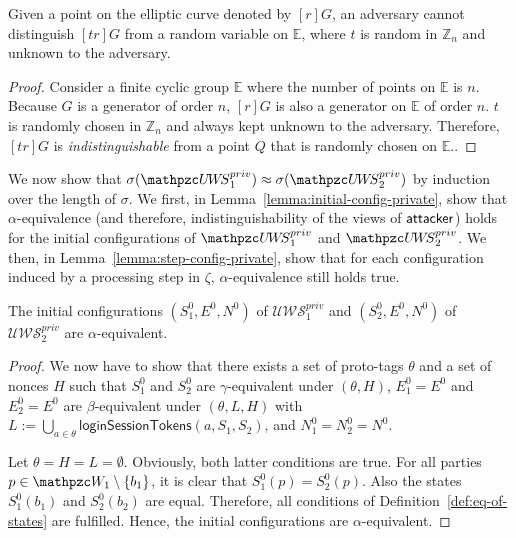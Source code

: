 \begin{theorem}
  \begin{lemma}\label{thm-idp-untraceability-new}
    Given a point on the elliptic curve denoted by $[r]G$, 
    an adversary cannot distinguish $[tr]G$ from a random variable on $\mathbb{E}$, 
    where $t$ is random in $\mathbb{Z}_n$ and unknown to the adversary.
  \end{lemma}
  \begin{proof}
    Consider a finite cyclic group $\mathbb{E}$ where the number of points on $\mathbb{E}$ is $n$. 
    Because $G$ is a generator of order $n$, $[r]G$ is also a generator on $\mathbb{E}$ of order $n$. 
    $t$ is randomly chosen in $\mathbb{Z}_n$ and always kept unknown to the adversary. 
    Therefore, $[tr]G$ is \emph{indistinguishable} from a point $Q$ that is randomly chosen on $\mathbb{E}$.\cite{oprf-proved,voprf-proved}.
  \end{proof}
  
  We now show that $\sigma(\uppressoprivwebsystem_1) \approx
  \sigma(\uppressoprivwebsystem_2)$ by induction over the length 
  of $\sigma$. We first, in Lemma~\ref{lemma:initial-config-private}, 
  show that $\alpha$-equivalence (and therefore, indistinguishability 
  of the views of $\mathsf{attacker}$) holds for the initial 
  configurations of $\uppressoprivwebsystem_1$ and 
  $\uppressoprivwebsystem_2$. We then, in 
  Lemma~\ref{lemma:step-config-private}, show that for each 
  configuration induced by a processing step in $\zeta$,
  $\alpha$-equivalence still holds true.
  
  \begin{lemma}\label{lemma:initial-config-private}
    The initial configurations $(S_1^0,E^0,N^0)$ of 
    $\mathcal{U\!W\!S}^{priv}_1$ and $(S_2^0,E^0,N^0)$ of 
    $\mathcal{U\!W\!S}^{priv}_2$ are $\alpha$-equivalent.
  \end{lemma}
  \begin{proof}
    We now have to show that there exists a set of proto-tags $\theta$ and a set of nonces $H$
    such that $S_1^0$ and $S_2^0$ are $\gamma$-equivalent under
    $(\theta,H)$, $E_1^0 = E^0$ and $E_2^0 = E^0$ are $\beta$-equivalent
    under $(\theta,L,H)$ with $L := \bigcup_{a\in\theta} \mathsf{loginSessionTokens}(a,S_1,S_2)$, and $N_1^0 = N_2^0 = N^0$.
  
    Let $\theta = H = L = \emptyset$. Obviously, both latter conditions are
    true. For all parties $p \in \bidsystem_1 \setminus \{b_1\}$, it is
    clear that $S_1^0(p) = S_2^0(p)$. Also the states $S_1^0(b_1)$ and
    $S_2^0(b_2)$ are equal. Therefore, all conditions
    of Definition~\ref{def:eq-of-states} are fulfilled. Hence, the
    initial configurations are $\alpha$-equivalent.
  \end{proof}
  

\end{theorem}
